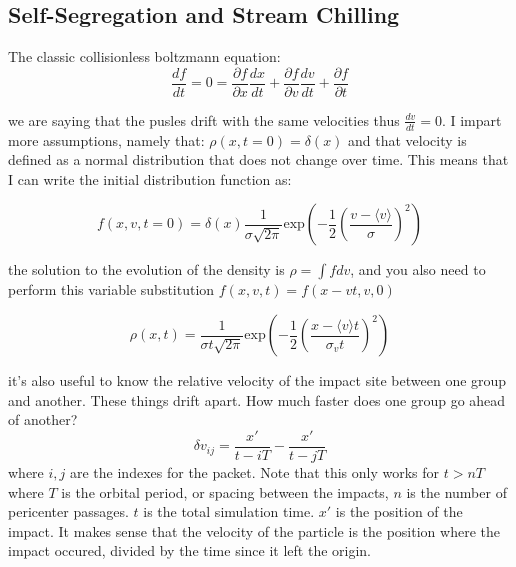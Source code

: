     \subsection{Self-Segregation and Stream Chilling}

    The classic collisionless boltzmann equation:
    \begin{equation}
        \frac{df}{dt} = 0 = \frac{\partial f}{\partial x} \frac{dx}{dt} + \frac{\partial f}{\partial v} \frac{dv}{dt}+ \frac{\partial f}{\partial t} 
    \end{equation}

    we are saying that the pusles drift with the same velocities thus $\frac{dv}{dt}=0$. I impart more assumptions, namely that: $\rho(x,t=0)=\delta(x)$ and that velocity is defined as a normal distribution that does not change over time. This means that I can write the initial distribution function as:
    
    \begin{equation}
        f(x,v,t=0) = \delta(x)\frac{1}{\sigma\sqrt{2\pi}}\textrm{exp}\left(-\frac{1}{2}\left(\frac{v-\langle v \rangle}{\sigma}\right)^2\right)
    \end{equation}    

    the solution to the evolution of the density is $\rho = \int f dv$, and you also need to perform this variable substitution $f(x,v,t) = f(x-vt,v,0)$

    \begin{equation}
        \rho(x,t) = \frac{1}{\sigma t \sqrt{2\pi} }\textrm{exp}\left(-\frac{1}{2}\left(\frac{x-\langle v \rangle t}{\sigma_v t}\right)^2\right)
    \end{equation}

    it's also useful to know the relative velocity of the impact site between one group and another. These things drift apart. How much faster does one group go ahead of another? 
    \begin{equation}
        \delta v_{ij} = \frac{x\prime}{t-iT} - \frac{x\prime}{t-jT}
    \end{equation}
    where $i,j$ are the indexes for the packet. Note that this only works for $t > nT$ where $T$ is the orbital period, or spacing between the impacts, $n$ is the number of pericenter passages. $t$ is the total simulation time. $x\prime$ is the position of the impact. It makes sense that the velocity of the particle is the position where the impact occured, divided by the time since it left the origin. 